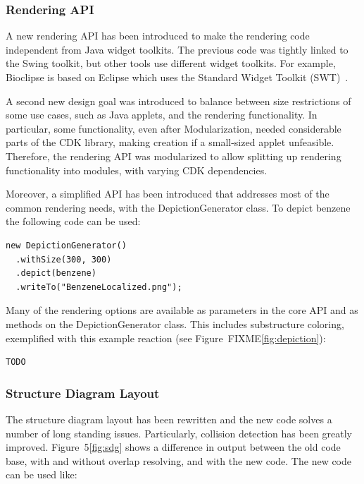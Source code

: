 \documentclass[10pt]{bmcart}
\begin{document}
\begin{verbatim}
\end{verbatim}

  \subsubsection*{Rendering API}

  A new rendering API has been introduced to make the rendering code independent
  from Java widget toolkits. The previous code was tightly linked to the Swing
  toolkit, but other tools use different widget toolkits. For example, Bioclipse
  is based on Eclipse which uses the Standard Widget Toolkit (SWT)~\cite{spjuth2007bioclipse}.
  
  A second new design goal was introduced to balance between size restrictions
  of some use cases, such as Java applets, and the rendering functionality. In
  particular, some functionality, even after Modularization, needed considerable
  parts of the CDK library, making creation if a small-sized applet unfeasible.
  Therefore, the rendering API was modularized to allow splitting up rendering
  functionality into modules, with varying CDK dependencies.
  
  
  Moreover, a simplified API has been introduced that addresses most of the
  common rendering needs, with the DepictionGenerator class. To depict benzene
  the following code can be used:

\begin{verbatim}
new DepictionGenerator()
  .withSize(300, 300)
  .depict(benzene)
  .writeTo("BenzeneLocalized.png");
\end{verbatim}

  Many of the rendering options are available as parameters in the core API
  and as methods on the DepictionGenerator class. This includes substructure
  coloring, exemplified with this example reaction (see Figure~FIXME\ref{fig:depiction}):

\begin{verbatim}
TODO
\end{verbatim}

  \subsubsection*{Structure Diagram Layout}

  The structure diagram layout has been rewritten and the new code solves a
  number of long standing issues. Particularly, collision detection has been
  greatly improved. Figure~5\ref{fig:sdg} shows a difference in output between
  the old code base, with and without overlap resolving, and with the new code.
  The new code can be used like:
\end{document}
